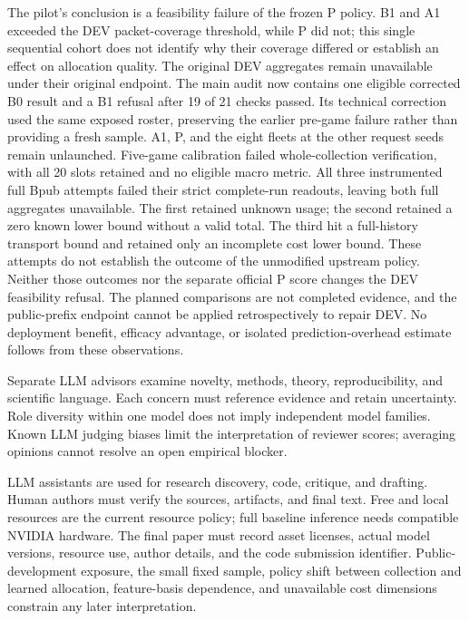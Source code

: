 \documentclass[11pt]{article}
\begin{document}
The pilot's conclusion is a feasibility failure of the frozen P policy. B1 and A1 exceeded the DEV packet-coverage threshold, while P did not; this single sequential cohort does not identify why their coverage differed or establish an effect on allocation quality. The original DEV aggregates remain unavailable under their original endpoint. The main audit now contains one eligible corrected B0 result and a B1 refusal after 19 of 21 checks passed. Its technical correction used the same exposed roster, preserving the earlier pre-game failure rather than providing a fresh sample. A1, P, and the eight fleets at the other request seeds remain unlaunched. Five-game calibration failed whole-collection verification, with all 20 slots retained and no eligible macro metric. All three instrumented full Bpub attempts failed their strict complete-run readouts, leaving both full aggregates unavailable. The first retained unknown usage; the second retained a zero known lower bound without a valid total. The third hit a full-history transport bound and retained only an incomplete cost lower bound. These attempts do not establish the outcome of the unmodified upstream policy. Neither those outcomes nor the separate official P score changes the DEV feasibility refusal. The planned comparisons are not completed evidence, and the public-prefix endpoint cannot be applied retrospectively to repair DEV. No deployment benefit, efficacy advantage, or isolated prediction-overhead estimate follows from these observations.

Separate LLM advisors examine novelty, methods, theory, reproducibility, and scientific language. Each concern must reference evidence and retain uncertainty. Role diversity within one model does not imply independent model families. Known LLM judging biases limit the interpretation of reviewer scores\cite{judge}; averaging opinions cannot resolve an open empirical blocker.

LLM assistants are used for research discovery, code, critique, and drafting. Human authors must verify the sources, artifacts, and final text. Free and local resources are the current resource policy; full baseline inference needs compatible NVIDIA hardware. The final paper must record asset licenses, actual model versions, resource use, author details, and the code submission identifier. Public-development exposure, the small fixed sample, policy shift between collection and learned allocation, feature-basis dependence, and unavailable cost dimensions constrain any later interpretation.
\end{document}
